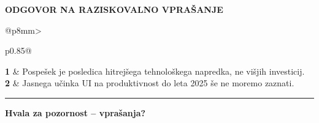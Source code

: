 \documentclass[aspectratio=169,10pt]{beamer}
\begin{document}
\begin{frame}[plain]
\vspace*{8mm}
{\color{hl}\footnotesize\bfseries ODGOVOR NA RAZISKOVALNO VPRAŠANJE}\par\vspace{6mm}
\begin{tabular}{@{}p{8mm}>{\raggedright\arraybackslash}p{0.85\textwidth}@{}}
{\color{hl}\fontsize{22}{26}\selectfont\bfseries 1} & {\fontsize{22}{26}\selectfont Pospešek je posledica hitrejšega tehnološkega napredka, ne višjih investicij.}\\[6mm]
{\color{hl}\fontsize{22}{26}\selectfont\bfseries 2} & {\fontsize{22}{26}\selectfont Jasnega učinka UI na produktivnost do leta 2025 še ne moremo zaznati.}\\
\end{tabular}
\vfill
{\color{rule}\rule{\linewidth}{0.6pt}}\par\vspace{3mm}
{\color{ink}\Large\bfseries Hvala za pozornost -- vprašanja?}\par
\vspace*{6mm}
\end{frame}
\end{document}
